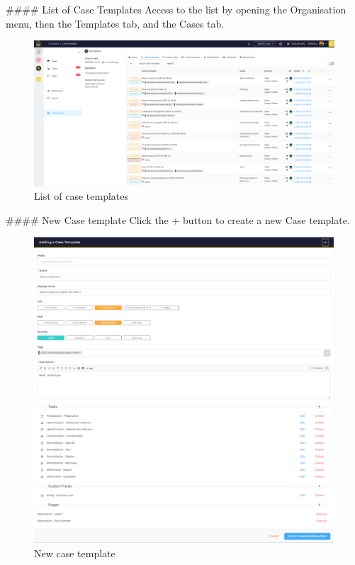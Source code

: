 


\begin{markdown}
#### List of Case Templates
Access to the list by opening the Organisation menu, then the Templates tab, and the Cases tab.
\end{markdown}

\begin{figure}[H]
    \centering
    \includegraphics[width=\textwidth]{images/docs/org_admin/templates/case/organisation-case-templates.png}
    \caption{List of case templates}
    \label{fig:modules}
\end{figure}

\begin{markdown}

#### New Case template
Click the + button to create a new Case template.
\end{markdown}



\begin{figure}[H]
    \centering
    \includegraphics[width=\textwidth]{images/docs/org_admin/templates/case/organisation-case-templates-2.png}
    \caption{New case template}
    \label{fig:modules}
\end{figure}


